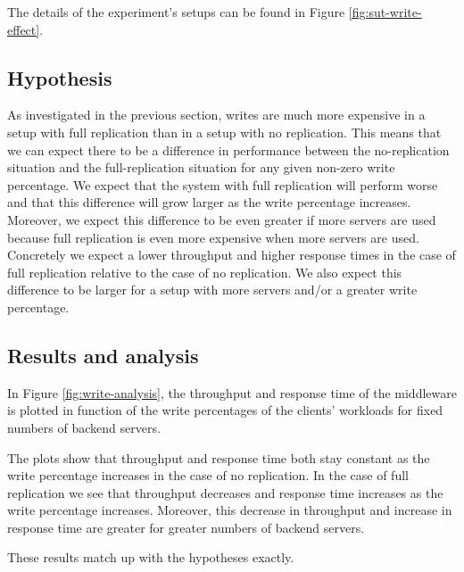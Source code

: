 \documentclass[11pt]{article}
\begin{document}
The details of the experiment's setups can be found in Figure \ref{fig:sut-write-effect}.


\subsection{Hypothesis}


As investigated in the previous section, writes are much more expensive in a setup with full replication than in a setup with no replication.
This means that we can expect there to be a difference in performance between the no-replication situation and the full-replication situation for any given non-zero write percentage.
We expect that the system with full replication will perform worse and that this difference will grow larger as the write percentage increases.
Moreover, we expect this difference to be even greater if more servers are used because full replication is even more expensive when more servers are used.
Concretely we expect a lower throughput and higher response times in the case of full replication relative to the case of no replication.
We also expect this difference to be larger for a setup with more servers and/or a greater write percentage.


\subsection{Results and analysis}

In Figure \ref{fig:write-analysis}, the throughput and response time of the middleware is plotted in function of the write percentages of the clients' workloads for fixed numbers of backend servers.

The plots show that throughput and response time both stay constant as the write percentage increases in the case of no replication.
In the case of full replication we see that throughput decreases and response time increases as the write percentage increases.
Moreover, this decrease in throughput and increase in response time are greater for greater numbers of backend servers.

These results match up with the hypotheses exactly.
\end{document}
